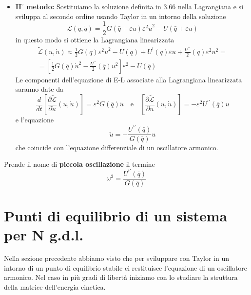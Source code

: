 \begin{itemize}
\item \textbf{$\bm{II}^{\circ}$ metodo:} Sostituiamo la soluzione definita in 3.66 nella Lagrangiana e si sviluppa al secondo ordine usando Taylor in un intorno della soluzione 
\begin{equation}
\mathcal{L}(q,\dot{q})=\frac{1}{2} G(\bar{q}+\varepsilon u) \varepsilon^2 \dot{u}^2-U(\bar{q}+\varepsilon u)
\end{equation}
in questo modo si ottiene la Lagrangiana linearizzata 
\begin{equation}
\begin{aligned}
&\tilde{\mathcal{L}}(u, \dot{u})\approx \frac{1}{2} G(\bar{q}) \varepsilon^2 \dot{u}^2-U(\bar{q})+U^{\prime}(\bar{q}) \varepsilon u+\frac{U^{\prime \prime}}{2}(\bar{q}) \varepsilon^2 u^2 =& \\[0.15in]
& = \left[\frac{1}{2} G(\bar{q}) \dot{u}^2-\frac{U^{\prime \prime}}{2}(\bar{q}) u^2\right] \varepsilon^2 - U(\bar{q})
\end{aligned}
\end{equation}
Le componenti dell'equazione di E-L associate alla Lagrangiana linearizzata saranno date da 
\begin{equation}
\frac{d}{d t}\left[\frac{\partial \tilde{\mathcal{L}}}{\partial \dot{u}}(u, \dot{u})\right]  =\varepsilon^2 G(\bar{q}) \ddot{u} \quad \text{e} \quad
{\left[\frac{\partial \tilde{\mathcal{L}}}{\partial u}(u, \dot{u})\right] }  =-\varepsilon^2 U^{\prime \prime}(\bar{q}) u
\end{equation}
e l'equazione
\begin{equation}
	\ddot{u} = -\frac{U^{\prime \prime}(\bar{q})}{G(\bar{q})}u
\end{equation}
che coincide con l'equazione differenziale di un oscillatore armonico.
\end{itemize}
Prende il nome di \textbf{piccola oscillazione} il termine 
\begin{equation}
	\omega^2 =  \frac{U^{\prime \prime}(\bar{q})}{G(\bar{q})}
\end{equation} 
\section{Punti di equilibrio di un sistema per N g.d.l.}
Nella sezione precedente abbiamo visto che per sviluppare con Taylor in un intorno di un punto di equilibrio stabile ci restituisce l'equazione di un oscillatore armonico. Nel caso in pi\`{u} gradi di libert\`{a} iniziamo con lo studiare la struttura della matrice dell'energia cinetica.
